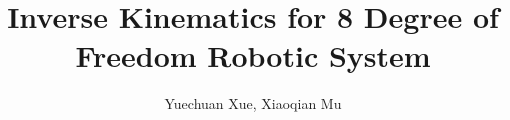 \documentclass[journal,comsoc]{IEEEtran}
\begin{document}
%
\title{Inverse Kinematics for 8 Degree of Freedom Robotic System}
%
%
%

\author{Yuechuan Xue, Xiaoqian Mu}%

% 
%



% 
\end{document}
